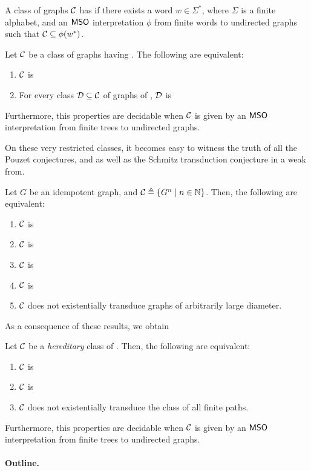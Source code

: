 \begin{definition}
  A class of graphs $\Cls$ has 
  if there exists a word $w \in \Sigma^*$, where $\Sigma$ is a finite alphabet,
  and an $\mathsf{MSO}$ interpretation $\phi$ from finite words to undirected graphs
  such that $\Cls \subseteq \phi(w^*)$.
\end{definition}

\begin{theorem}
  Let $\Cls$ be a class of graphs having .
  The following are equivalent:
  \begin{enumerate}
    \item $\Cls$ is 
    \item For every class $\Cls[D] \subseteq \Cls$ of graphs of
      ,
      $\Cls[D]$ is 
  \end{enumerate}
  Furthermore, this properties are decidable when $\Cls$ is given 
  by an $\mathsf{MSO}$ interpretation from finite trees to undirected graphs.
\end{theorem}

On these very restricted classes, it becomes easy to witness the truth of all
the Pouzet conjectures, and as well as the Schmitz transduction conjecture in a
weak from.

\begin{theorem}
  Let $G$ be an idempotent graph,
  and $\Cls \defined \setof{ G^n }{n \in \Nat}$.
  Then, the following are equivalent:
  \begin{enumerate}
    \item $\Cls$ is 
    \item $\Cls$ is 
    \item $\Cls$ is 
    \item $\Cls$ is 
    \item $\Cls$ does not existentially transduce
      graphs of arbitrarily large diameter.
  \end{enumerate}
\end{theorem}

As a consequence of these results,
we obtain 

\begin{theorem}
  Let $\Cls$ be a \emph{hereditary} class of .
  Then, the following are equivalent:
  \begin{enumerate}
    \item $\Cls$ is 
    \item $\Cls$ is 
    \item $\Cls$ does not existentially transduce
      the class of all finite paths.
  \end{enumerate}
  Furthermore, this properties are decidable when $\Cls$ is given
  by an $\mathsf{MSO}$ interpretation from finite trees to undirected graphs.
\end{theorem}

\paragraph*{Outline.}
